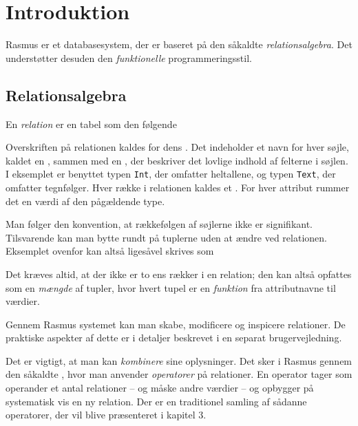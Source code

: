 	\section{Introduktion}
	{\sc Rasmus} er et databasesystem, der er baseret p\aa{} den s\aa{}kaldte
	{\em relations\-algebra}. Det underst\o{}tter desuden den {\em funktionelle\/}
	programmeringsstil.

	\subsection{Relationsalgebra}
En {\em relation\/} er en tabel som den f\o{}lgende
\begin{center}
\end{center}
Overskriften p\aa{} relationen kaldes for dens {\em {}}. 
Det indeholder
et navn for hver s\o{}jle, kaldet en {\em {}}, 
sammen med en
{\em {}}, der beskriver det lovlige indhold af felterne i s\o{}jlen.
I eksemplet er benyttet typen \verb"Int", der omfatter heltallene, og typen
\verb"Text", der omfatter tegnf\o{}lger.
Hver r\ae{}kke i relationen kaldes et {\em {}}. For hver attribut
rummer det en v\ae{}rdi af den p\aa{}g\ae{}ldende type.

Man f\o{}lger den konvention, at r\ae{}kkef\o{}lgen af s\o{}jlerne
ikke er signifikant. Tilsvarende kan man bytte rundt p\aa{} tuplerne
uden at \ae{}ndre ved relationen. Eksemplet ovenfor kan alts\aa{}
liges\aa{}vel skrives som
\begin{center}
\end{center}
Det kr\ae{}ves altid, at der ikke
er to ens r\ae{}kker i en relation; den kan alts\aa{} opfattes som en
{\em m\ae{}ngde\/} af tupler, hvor hvert tupel er en {\em funktion\/}
fra attributnavne til v\ae{}rdier.

Gennem {\sc Rasmus} systemet kan man skabe, modificere og inspicere
relationer. De praktiske aspekter af dette er i detaljer beskrevet 
i en separat brugervejledning.

Det er vigtigt, at man kan {\em kombinere\/} sine oplysninger.
Det sker i {\sc Rasmus} gennem den s\aa{}kaldte
{\em {}}, hvor man 
anvender {\em operatorer\/} p\aa{} relationer. En operator
tager som operander et antal relationer -- og m\aa{}ske andre v\ae{}rdier --
og opbygger p\aa{} systematisk vis en ny relation.
Der er en traditionel samling af s\aa{}danne operatorer, der vil blive
pr\ae{}senteret i kapitel 3. 

